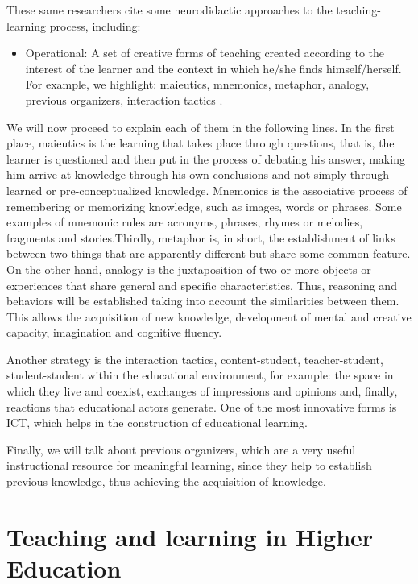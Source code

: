 \documentclass[english]{textolivre}
\begin{document}
These same researchers cite some neurodidactic approaches to the teaching-learning process, including:

\begin{itemize}
    \item Operational: A set of creative forms of teaching created according to the interest of the learner and the context in which he/she finds himself/herself. For example, we highlight: maieutics, mnemonics, metaphor, analogy, previous organizers, interaction tactics \cite{_cusme_estrategias_2021}.
\end{itemize}

We will now proceed to explain each of them in the following lines. In the first place, maieutics is the learning that takes place through questions, that is, the learner is questioned and then put in the process of debating his answer, making him arrive at knowledge through his own conclusions and not simply through learned or pre-conceptualized knowledge. Mnemonics is the associative process of remembering or memorizing knowledge, such as images, words or phrases. Some examples of mnemonic rules are acronyms, phrases, rhymes or melodies, fragments and stories.Thirdly, metaphor is, in short, the establishment of links between two things that are apparently different but share some common feature. On the other hand, analogy is the juxtaposition of two or more objects or experiences that share general and specific characteristics. Thus, reasoning and behaviors will be established taking into account the similarities between them. This allows the acquisition of new knowledge, development of mental and creative capacity, imagination and cognitive fluency.

Another strategy is the interaction tactics, content-student, teacher-student, student-student within the educational environment, for example: the space in which they live and coexist, exchanges of impressions and opinions and, finally, reactions that educational actors generate. One of the most innovative forms is ICT, which helps in the construction of educational learning.

Finally, we will talk about previous organizers, which are a very useful instructional resource for meaningful learning, since they help to establish previous knowledge, thus achieving the acquisition of knowledge.

\section{Teaching and learning in Higher Education}
\end{document}
